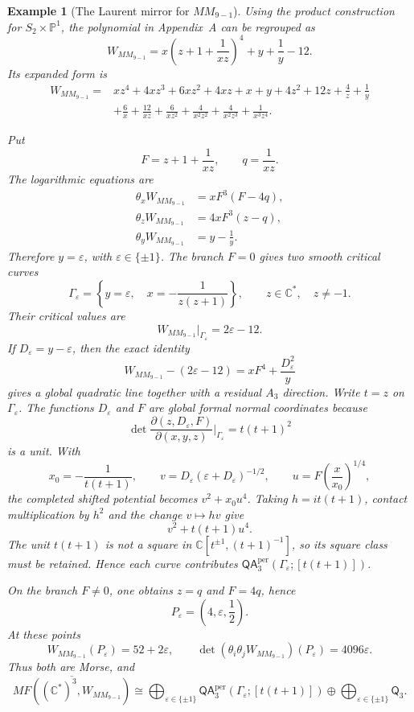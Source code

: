 \documentclass[11pt]{amsart}
\newtheorem{example}{Example}[section]
\newcommand{\MorseCat}[1]{\mathsf{Q}_{#1}}
\newcommand{\QAtwist}[3]{\mathsf{QA}^{\mathrm{per}}_{#2}(#1;[#3])}
\begin{document}
\begin{example}[The Laurent mirror for $MM_{9-1}$]
Using the product construction for $S_2\times\mathbb P^1$, the polynomial in
Appendix~A can be regrouped as
\[
W_{MM_{9-1}}
=x\left(z+1+\frac{1}{xz}\right)^4+y+\frac{1}{y}-12.
\]
Its expanded form is
\[
\begin{aligned}
W_{MM_{9-1}}={}&xz^4+4xz^3+6xz^2+4xz+x+y
 +4z^2+12z+\frac{4}{z}+\frac{1}{y}\\
&+\frac{6}{x}+\frac{12}{xz}+\frac{6}{xz^2}
 +\frac{4}{x^2z^2}+\frac{4}{x^2z^3}+\frac{1}{x^3z^4}.
\end{aligned}
\]

Put
\[
F=z+1+\frac1{xz},
\qquad
q=\frac1{xz}.
\]
The logarithmic equations are
\[
\begin{aligned}
\theta_xW_{MM_{9-1}}&=xF^3(F-4q),\\
\theta_zW_{MM_{9-1}}&=4xF^3(z-q),\\
\theta_yW_{MM_{9-1}}&=y-\frac1y.
\end{aligned}
\]
Therefore $y=\varepsilon$, with $\varepsilon\in\{\pm1\}$.  The branch
$F=0$ gives two smooth critical curves
\[
\Gamma_\varepsilon=
\left\{
y=\varepsilon,\quad
x=-\frac1{z(z+1)}
\right\},
\qquad
z\in\mathbb C^*,\quad z\neq-1.
\]
Their critical values are
\[
W_{MM_{9-1}}|_{\Gamma_\varepsilon}=2\varepsilon-12.
\]
If $D_\varepsilon=y-\varepsilon$, then the exact identity
\[
W_{MM_{9-1}}-(2\varepsilon-12)
=xF^4+\frac{D_\varepsilon^2}{y}
\]
gives a global quadratic line together with a residual $A_3$ direction. Write
$t=z$ on $\Gamma_\varepsilon$. The functions $D_\varepsilon$ and $F$ are
global formal normal coordinates because
\[
\det\frac{\partial(z,D_\varepsilon,F)}{\partial(x,y,z)}
\bigg|_{\Gamma_\varepsilon}=t(t+1)^2
\]
is a unit. With
\[
x_0=-\frac1{t(t+1)},\qquad
v=D_\varepsilon(\varepsilon+D_\varepsilon)^{-1/2},\qquad
u=F\left(\frac{x}{x_0}\right)^{1/4},
\]
the completed shifted potential becomes $v^2+x_0u^4$. Taking
$h=it(t+1)$, contact multiplication by $h^2$ and the change $v\mapsto hv$
give
\[
v^2+t(t+1)u^4.
\]
The unit $t(t+1)$ is not a square in
$\mathbb C[t^{\pm1},(t+1)^{-1}]$, so its square class must be retained. Hence
each curve contributes $\QAtwist{\Gamma_\varepsilon}{3}{t(t+1)}$.

On the branch $F\neq0$, one obtains $z=q$ and $F=4q$, hence
\[
P_\varepsilon=\left(4,\varepsilon,\frac12\right).
\]
At these points
\[
W_{MM_{9-1}}(P_\varepsilon)=52+2\varepsilon,
\qquad
\det(\theta_i\theta_jW_{MM_{9-1}})(P_\varepsilon)
=4096\varepsilon.
\]
Thus both are Morse, and
\[
\overline{MF((\mathbb C^*)^3,W_{MM_{9-1}})}
\cong
\bigoplus_{\varepsilon\in\{\pm1\}}
\QAtwist{\Gamma_\varepsilon}{3}{t(t+1)}
\oplus
\bigoplus_{\varepsilon\in\{\pm1\}}\MorseCat{3}.
\]
\end{example}
\end{document}
